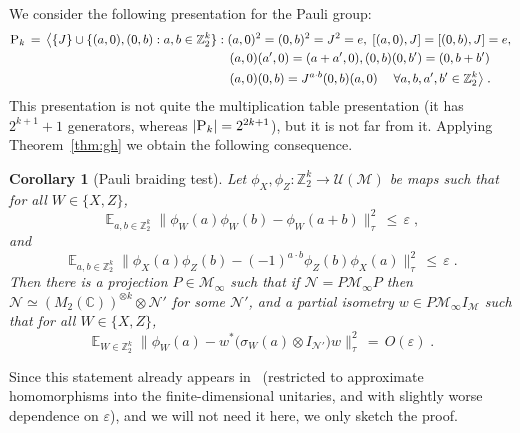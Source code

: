 \documentclass[11pt]{article}
\newtheorem{corollary}[theorem]{Corollary}
\theoremstyle{definition}
\newcommand{\Id}{\ensuremath{I}}
\DeclareMathOperator*{\Expectation}{\mathbb{E}}
\newcommand{\Es}[1]{\Expectation_{#1}}
\newcommand{\C}{\ensuremath{\mathbb{C}}}
\newcommand{\Z}{\ensuremath{\mathbb{Z}}}
\newcommand{\mM}{\ensuremath{\mathcal{M}}}
\newcommand{\mU}{\ensuremath{\mathcal{U}}}
\newcommand{\eps}{\varepsilon}
\newcommand{\mN}{\mathcal{N}}
\newcommand{\gamestyle}[1]{\ensuremath{\textsc{#1}}\xspace}
\newcommand{\pauli}{\gamestyle{P}}
\begin{document}
We consider the following presentation for the Pauli group:
\begin{align}
 \pauli_k \,=\, \big\langle \{J\}\cup  \{(a,0),(0,b): a,b\in \Z_2^k\} &: (a,0)^2=(0,b)^2=J^2=e,\; [(a,0),J]=[(0,b),J]=e,\notag\\
 &\quad(a,0)(a',0)=(a+a',0),(0,b)(0,b')=(0,b+b') \notag\\
&\quad  (a,0)(0,b) = J^{a\cdot b} (0,b)(a,0) \; \quad \forall a,b,a',b'\in \Z_2^k\big\rangle\;.\label{eq:almost_mult_table_pres_of_Pauli}
\end{align}
This presentation is not quite the multiplication table presentation (it has $2^{k+1}+1$ generators, whereas $|\pauli_k|=2^{2k+1}$), but it is not far from it.  
Applying Theorem~\ref{thm:gh} we obtain the following consequence.%

\begin{corollary}[Pauli braiding test]\label{cor:Pauli-brading_is_stable}
Let $\phi_X,\phi_Z:\Z_2^k \to \mU(\mM)$ be maps such that for all $W\in \{X,Z\}$,
\[ \Es{a,b\in \Z_2^k} \big\| \phi_W(a)\phi_W(b)-\phi_W(a+b) \big\|_\tau^2 \,\leq\,\eps\;,\]
and
\[ \Es{a,b\in \Z_2^k} \big\| \phi_X(a)\phi_Z(b)- (-1)^{a\cdot b} \phi_Z(b)\phi_X(a) \big\|_{\tau}^2 \,\leq\,\eps\;.\]
Then there is a projection $P\in \mM_\infty$ such that if $\mN=P\mM_\infty P$ then $\mN\simeq (M_2(\C))^{\otimes k} \otimes \mN'$ for some $\mN'$, and a
partial isometry $w\in P\mM_\infty I_\mM$ such that for all $W\in \{X,Z\}$, 
\[ \Es{W\in \Z_2^k} \big\| \phi_W(a) - w^* \big(\sigma_W(a)\otimes \Id_{\mN'}\big) w \big\|_{\tau}^2 \,=\, O(\eps)\;.\]
\end{corollary}

Since this statement already appears in~\cite{natarajan2017quantum} (restricted to approximate homomorphisms into the finite-dimensional unitaries, and with slightly worse dependence on $\eps$), and we will not need it here, we only sketch the proof. 
\end{document}
